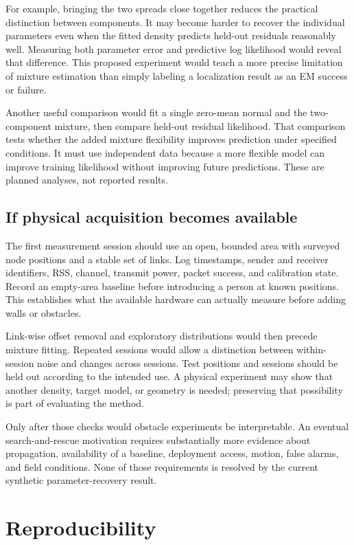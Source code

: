 \documentclass[conference,letterpaper]{IEEEtran}
\begin{document}
For example, bringing the two spreads close together reduces the practical distinction between components. It may become harder to recover the individual parameters even when the fitted density predicts held-out residuals reasonably well. Measuring both parameter error and predictive log likelihood would reveal that difference. This proposed experiment would teach a more precise limitation of mixture estimation than simply labeling a localization result as an EM success or failure.

Another useful comparison would fit a single zero-mean normal and the two-component mixture, then compare held-out residual likelihood. That comparison tests whether the added mixture flexibility improves prediction under specified conditions. It must use independent data because a more flexible model can improve training likelihood without improving future predictions. These are planned analyses, not reported results.

\subsection{If physical acquisition becomes available}
The first measurement session should use an open, bounded area with surveyed node positions and a stable set of links. Log timestamps, sender and receiver identifiers, RSS, channel, transmit power, packet success, and calibration state. Record an empty-area baseline before introducing a person at known positions. This establishes what the available hardware can actually measure before adding walls or obstacles.

Link-wise offset removal and exploratory distributions would then precede mixture fitting. Repeated sessions would allow a distinction between within-session noise and changes across sessions. Test positions and sessions should be held out according to the intended use. A physical experiment may show that another density, target model, or geometry is needed; preserving that possibility is part of evaluating the method.

Only after those checks would obstacle experiments be interpretable. An eventual search-and-rescue motivation requires substantially more evidence about propagation, availability of a baseline, deployment access, motion, false alarms, and field conditions. None of those requirements is resolved by the current synthetic parameter-recovery result.

\section{Reproducibility}
\end{document}
